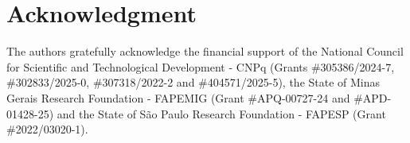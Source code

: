 \section*{Acknowledgment}
The authors gratefully acknowledge the financial support of the National Council for Scientific and Technological Development - CNPq (Grants \#305386/2024-7, \#302833/2025-0, \#307318/2022-2 and \#404571/2025-5), the State of Minas Gerais Research Foundation - FAPEMIG (Grant \#APQ-00727-24 and \#APD-01428-25) and the State of São Paulo Research Foundation - FAPESP (Grant \#2022/03020-1).